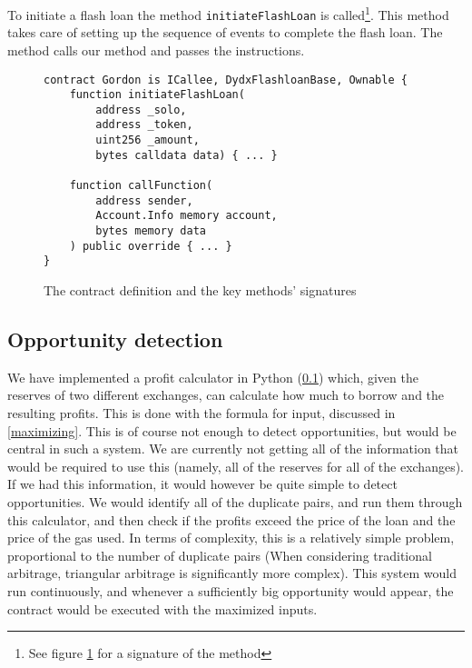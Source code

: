 \noindent To initiate a flash loan the method \verb|initiateFlashLoan| is
called\footnote{See figure \ref{signature} for a signature of the method}. This
method takes care of setting up the sequence of events to complete the flash
loan. The method calls our  method and passes the
instructions.

\begin{figure}[H]
\begin{lstlisting}[language=Solidity,numbers=none]
contract Gordon is ICallee, DydxFlashloanBase, Ownable {
    function initiateFlashLoan(
        address _solo,
        address _token,
        uint256 _amount,
        bytes calldata data) { ... }

    function callFunction(
        address sender,
        Account.Info memory account,
        bytes memory data
    ) public override { ... }
}
\end{lstlisting}
    \caption{The contract definition and the key methods' signatures}
    \label{signature}
\end{figure}

\subsection{Opportunity detection}
We have implemented a profit calculator in Python (\ref{}) which, given the reserves of
two different exchanges, can calculate how much to borrow and the resulting
profits. This is done with the formula for input, discussed in
\autoref{maximizing}. This is of course not enough to detect opportunities, but
would be central in such a system. We are currently not getting all of the
information that would be required to use this (namely, all of the reserves for
all of the exchanges). If we had this information, it would however be quite
simple to detect opportunities. We would identify all of the duplicate pairs,
and run them through this calculator, and then check if the profits exceed the
price of the loan and the price of the gas used. In terms of complexity, this is
a relatively simple problem, proportional to the number of duplicate pairs (When
considering traditional arbitrage, triangular arbitrage is significantly more
complex). This system would run continuously, and whenever a sufficiently big
opportunity would appear, the contract would be executed with the maximized
inputs.

